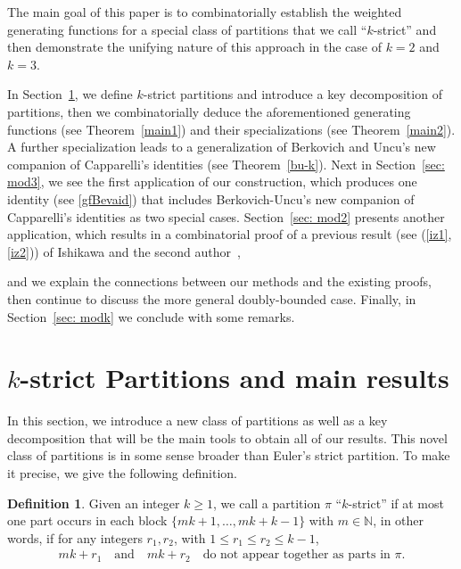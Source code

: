 \documentclass[12pt]{amsart}
\numberwithin{equation}{section}
\theoremstyle{plain}
\theoremstyle{definition}
\newtheorem{Def}[theorem]{Definition}
\newcommand{\N}{\mathbb{N}}
\begin{document}
The main goal of this paper is to combinatorially establish the weighted generating functions for a special class of partitions that we call ``$k$-strict'' and then demonstrate the unifying nature of this approach in the case of $k=2$ and $k=3$.

In Section~\ref{sec: kstrict}, we define $k$-strict partitions and introduce a key decomposition of partitions, then we combinatorially deduce the aforementioned generating functions (see Theorem~\ref{main1}) and their specializations (see Theorem~\ref{main2}). A further specialization leads to a generalization of Berkovich and Uncu's new companion of Capparelli's identities (see Theorem~\ref{bu-k}). Next in Section~\ref{sec: mod3}, we see the first application of our construction, which produces one identity (see \eqref{gfBevaid}) that includes Berkovich-Uncu's new companion of Capparelli's identities as two special cases. Section~\ref{sec: mod2} presents another application, which results in a combinatorial proof of  a previous result (see (\ref{iz1}, \ref{iz2}))
of Ishikawa and the second author~\cite{iz},
 
and we explain the connections between our methods and the existing proofs, then continue to discuss the more general doubly-bounded case. Finally, in Section~\ref{sec: modk} we conclude with some remarks.   






\section{$k$-strict Partitions and main results}\label{sec: kstrict}

In this section, we introduce a new class of partitions as well as a key decomposition that will be the main tools to obtain all of our results. This novel class of partitions is in some sense broader than Euler's strict partition. To make it precise, we give the following definition.
\begin{Def}\label{kstrictdef}
Given an integer $k\geq 1$, we call a partition $\pi$ ``$k$-strict'' if 
at most one part occurs in each block $\{mk+1, \ldots, mk+k-1\}$ with $m\in \N$, in other words,
if for any integers $r_1,r_2$, with $ 1\leq r_1\leq r_2\leq k-1$,
\begin{align}\label{kstrictcond}
mk+r_1\quad \text{and} \quad mk+r_2 \quad\text{do not appear together as   parts in } \pi.
\end{align} 
\end{Def}
\end{document}
